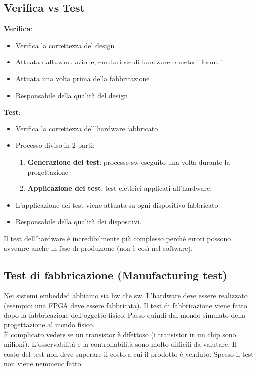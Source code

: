 \documentclass[a4paper]{article}
\theoremstyle{definition}
\begin{document}
		\subsection{Verifica vs Test}
			\begin{multicols}{2}
				
				\textbf{Verifica}:
				\begin{itemize}
					\item Verifica la correttezza del design
					\item Attuata dalla simulazione, emulazione di hardware o metodi formali
					\item Attuata una volta prima della fabbricazione
					\item Responsabile della qualità del design
				\end{itemize}
				
				\columnbreak

				\textbf{Test}:
				\begin{itemize}
					\item Verifica la correttezza dell'hardware fabbricato
					\item Processo diviso in 2 parti:
					\begin{enumerate}
						\item \textbf{Generazione dei test}: processo sw eseguito una volta durante la progettazione
						\item \textbf{Applicazione dei test}: test elettrici applicati all'hardware.
					\end{enumerate}
					\item L'applicazione dei test viene attuata su ogni dispositivo fabbricato
					\item Responsabile della qualità dei dispositivi.
				\end{itemize}
			\end{multicols}
			Il test dell'hardware è incredibilmente più complesso perché errori possono avvenire anche in fase di produzione (non è così nel software).
	
		\subsection{Test di fabbricazione (Manufacturing test)}
			Nei sistemi embedded abbiamo sia hw che sw. L'hardware deve essere realizzato (esempio: una FPGA deve essere fabbricata). Il test di fabbricazione viene fatto dopo la fabbricazione dell'oggetto fisico. Passo quindi dal mondo simulato della progettazione al mondo fisico. \\
			È complicato vedere se un transistor è difettoso (i transistor in un chip sono milioni). L'osservabilità e la controllabilità sono molto difficili da valutare.
			Il costo del test non deve superare il costo a cui il prodotto è venduto. Spesso il test non viene nemmeno fatto.
		
\end{document}
